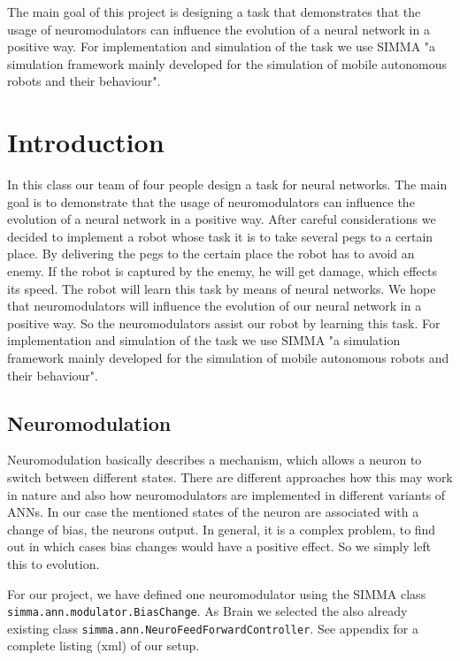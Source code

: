 \documentclass[12pt,fleqn,a4paper]{article}
\begin{document}
\clearpage
\pagestyle{headings}
\setcounter{page}{1}
\setcounter{page}{1}

\tableofcontents
\newpage

\abstract
{The main goal of this project is designing a task that demonstrates that the usage of neuromodulators can influence the evolution of a neural network in a positive way. For implementation and simulation of the task we use SIMMA "a simulation framework mainly developed for the simulation of mobile autonomous robots and their behaviour".}

\section{Introduction}
In this class our team of four people design a task for neural networks.  The main goal is to demonstrate that the usage of neuromodulators can influence the evolution of a neural network in a positive way. After careful considerations we decided to implement a robot whose task it is to take several pegs to a certain place. By delivering the pegs to the certain place the robot has to avoid an enemy. If the robot is captured by the enemy, he will get damage, which effects its speed. The robot will learn this task by means of neural networks.  We hope that neuromodulators will influence the evolution of our neural network in a positive way. So the neuromodulators assist our robot by learning this task. For implementation and simulation of the task we use SIMMA "a simulation framework mainly developed for the simulation of mobile autonomous robots and their behaviour".

\subsection{Neuromodulation}
Neuromodulation basically describes a mechanism, which allows a neuron to switch between different states. There are different approaches how this may work in nature and also how neuromodulators are implemented in different variants of ANNs. In our case the mentioned states of the neuron are associated with a change of bias, the neurons output. In general, it is a complex problem, to find out in which cases bias changes would have a positive effect. So we simply left this to evolution.

For our project, we have defined one neuromodulator using the SIMMA class \texttt{simma.ann.modulator.BiasChange}. As Brain we selected the also already existing class \texttt{simma.ann.NeuroFeedForwardController}. See appendix for a complete listing (xml) of our setup.
\end{document}
